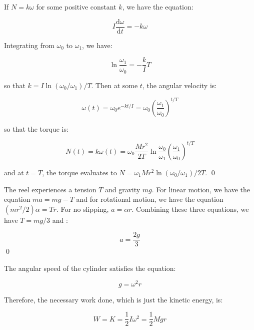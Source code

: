\documentclass[12pt]{article}
\begin{document}
If $N = k \omega$ for some positive constant $k$, we have the equation:

\begin{equation}
    I \frac{\mathrm{d}\omega}{\mathrm{d}t} = -k \omega
\end{equation}

Integrating from $\omega_{0}$ to $\omega_{1}$, we have:

\begin{equation}
    \ln{\frac{\omega_{1}}{\omega_{0}}} = -\frac{k}{I} T
\end{equation}

so that $k = I \ln{(\omega_{0}/\omega_{1})}/T$. Then at some $t$, the angular velocity is:

\begin{equation}
    \omega(t) = \omega_{0} e^{-k t/I} = \omega_{0} \left( \frac{\omega_{1}}{\omega_{0}} \right)^{t/T}
\end{equation}

so that the torque is:

\begin{equation}
    N(t) = k \omega(t) = \omega_{0} \frac{Mr^{2}}{2T} \ln{\frac{\omega_{0}}{\omega_{1}}} \left( \frac{\omega_{1}}{\omega_{0}} \right)^{t/T}
\end{equation}

and at $t = T$, the torque evaluates to $N = \omega_{1} Mr^{2}\ln{(\omega_{0}/\omega_{1})}/2T$.
\qed


The reel experiences a tension $T$ and gravity $mg$. For linear motion, we have the equation $ma = mg - T$ and for rotational motion, we have the equation $(mr^{2}/2) \alpha = T r$. For no slipping, $a = \alpha r$. Combining these three equations, we have $T = mg/3$ and :

\begin{equation}
    a = \frac{2g}{3}
\end{equation}
\qed



The angular speed of the cylinder satisfies the equation:

\begin{equation}
    g = \omega^{2} r
\end{equation}

Therefore, the necessary work done, which is just the kinetic energy, is:

\begin{equation}
    W = K = \frac{1}{2} I \omega^{2} = \frac{1}{2} Mgr
\end{equation}
\end{document}
